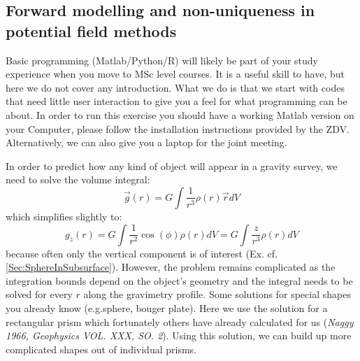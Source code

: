 \documentclass[a4paper,12pt]{article}
\begin{document}
\subsection{Forward modelling and non-uniqueness in potential field methods}
\begin{tcolorbox}[enhanced jigsaw,breakable,pad at break*=1mm,
  colback=blue!5!white,colframe=burgundy,title=Matlab (or Python),
  watermark color=white]
  Basic programming (Matlab/Python/R) will  likely be part of your study experience when you move to MSc level courses. It is a useful skill to have, but here we do not cover any introduction. What we do is that we start with codes that need  little user interaction to give you a feel for what programming can be about. In order to run this exercise you should have a working Matlab version on your Computer, please follow the installation instructions provided by the ZDV. Alternatively, we can also give you a laptop for the joint meeting.
\end{tcolorbox}
\label{Sec:GravityForwardModelling}
In order to predict how any kind of object will appear in a gravity survey, we need to solve the volume integral:
$$
 \vec{g}(r) = G\int \frac{1}{r^3} \rho(r) \vec{r} dV 
$$
which simplifies slightly to:
$$
 g_z(r) = G\int \frac{1}{r^2} \cos(\phi)\rho(r) dV = G\int \frac{z}{r^3} \rho(r) dV
$$
because often only the vertical component is of interest (Ex. cf. \ref{Sec:SphereInSubsurface}).
However, the problem remains complicated as the integration bounds depend on the object's geometry and the integral needs to be solved for every $r$ along the gravimetry profile. Some solutions for special shapes you already know (e.g.sphere, bouger plate). Here we use the solution for a rectangular prism which fortunately others have already calculated for us (\textit{Naggy 1966, Geophysics VOL. XXX, SO. 2}). Using this solution, we can build up more complicated shapes out of individual prisms.
\end{document}
